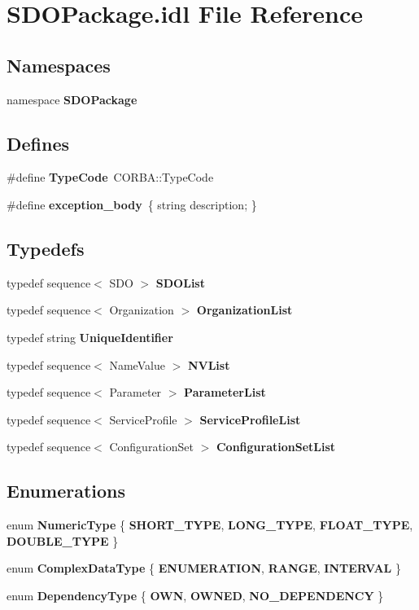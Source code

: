 \section{SDOPackage.idl File Reference}
\label{SDOPackage_8idl}
\subsection*{Namespaces}
\begin{CompactItemize}
\item 
namespace {\bf SDOPackage}
\end{CompactItemize}
\subsection*{Defines}
\begin{CompactItemize}
\item 
\#define {\bf Type\-Code}~CORBA::Type\-Code
\item 
\#define {\bf exception\_\-body}~\{ string description; \}
\end{CompactItemize}
\subsection*{Typedefs}
\begin{CompactItemize}
\item 
typedef sequence$<$ SDO $>$ {\bf SDOList}
\item 
typedef sequence$<$ Organization $>$ {\bf Organization\-List}
\item 
typedef string {\bf Unique\-Identifier}
\item 
typedef sequence$<$ Name\-Value $>$ {\bf NVList}
\item 
typedef sequence$<$ Parameter $>$ {\bf Parameter\-List}
\item 
typedef sequence$<$ Service\-Profile $>$ {\bf Service\-Profile\-List}
\item 
typedef sequence$<$ Configuration\-Set $>$ {\bf Configuration\-Set\-List}
\end{CompactItemize}
\subsection*{Enumerations}
\begin{CompactItemize}
\item 
enum {\bf Numeric\-Type} \{ {\bf SHORT\_\-TYPE}, 
{\bf LONG\_\-TYPE}, 
{\bf FLOAT\_\-TYPE}, 
{\bf DOUBLE\_\-TYPE}
 \}
\item 
enum {\bf Complex\-Data\-Type} \{ {\bf ENUMERATION}, 
{\bf RANGE}, 
{\bf INTERVAL}
 \}
\item 
enum {\bf Dependency\-Type} \{ {\bf OWN}, 
{\bf OWNED}, 
{\bf NO\_\-DEPENDENCY}
 \}
\end{CompactItemize}
